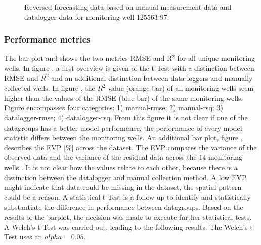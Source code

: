 \begin{figure}[htbp]
\begin{minipage}{0.32\textwidth}
        \caption{Reversed forecasting data based on manual measurement data and datalogger data for monitoring well 125563-97.}
        \label{combiheij}
    \end{minipage}
\end{figure}

\newpage
\subsubsection{Performance metrics}
The bar plot  and  shows the two metrics RMSE and R$^2$ for all unique monitoring wells. In figure , a first overview is given of the t-Test with a distinction between RMSE and $R^2$ and an additional distinction between data loggers and manually collected wells. In figure , the $R^2$ value (orange bar) of all monitoring wells seem higher than the values of the RMSE (blue bar) of the same monitoring wells. Figure  encompasses four categories: 1) manual-rmse; 2) manual-rsq; 3) datalogger-rmse; 4) datalogger-rsq. From this figure it is not clear if one of the datagroups has a better model performance, the performance of every model statistic differs between the monitoring wells. An additional bar plot, figure , describes the EVP [\%] across the dataset. The EVP compares the variance of the observed data and the variance of the residual data across the 14 monitoring wells \cite{asmuth-2021}. It is not clear how the values relate to each other, because there is a distinction between the datalogger and manual collection method. A low EVP might indicate that data could be missing in the dataset, the spatial pattern could be a reason. A statistical t-Test is a follow-up to identify and statistically substantiate the difference in performance between datagroups. Based on the results of the barplot, the decision was made to execute further statistical tests. A Welch's t-Test was carried out, leading to the following results. The Welch's t-Test uses an \(alpha=0.05\).

